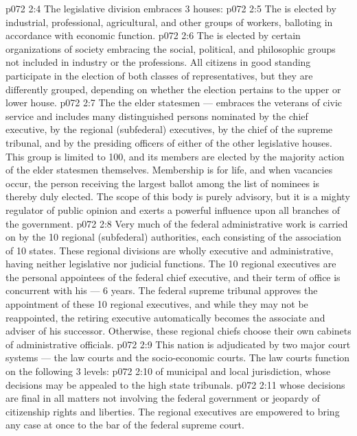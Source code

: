 \vs p072 2:4 \pc The legislative division embraces 3 houses:
\vs p072 2:5 \bibnobreakspace The  is elected by industrial, professional, agricultural, and other groups of workers, balloting in accordance with economic function.
\vs p072 2:6 \bibnobreakspace The  is elected by certain organizations of society embracing the social, political, and philosophic groups not included in industry or the professions. All citizens in good standing participate in the election of both classes of representatives, but they are differently grouped, depending on whether the election pertains to the upper or lower house.
\vs p072 2:7 \bibnobreakspace The  the elder statesmen --- embraces the veterans of civic service and includes many distinguished persons nominated by the chief executive, by the regional (subfederal) executives, by the chief of the supreme tribunal, and by the presiding officers of either of the other legislative houses. This group is limited to 100, and its members are elected by the majority action of the elder statesmen themselves. Membership is for life, and when vacancies occur, the person receiving the largest ballot among the list of nominees is thereby duly elected. The scope of this body is purely advisory, but it is a mighty regulator of public opinion and exerts a powerful influence upon all branches of the government.
\vs p072 2:8 \pc Very much of the federal administrative work is carried on by the 10 regional (subfederal) authorities, each consisting of the association of 10 states. These regional divisions are wholly executive and administrative, having neither legislative nor judicial functions. The 10 regional executives are the personal appointees of the federal chief executive, and their term of office is concurrent with his --- 6 years. The federal supreme tribunal approves the appointment of these 10 regional executives, and while they may not be reappointed, the retiring executive automatically becomes the associate and adviser of his successor. Otherwise, these regional chiefs choose their own cabinets of administrative officials.
\vs p072 2:9 \pc This nation is adjudicated by two major court systems --- the law courts and the socio\hyp{}economic courts. The law courts function on the following 3 levels:
\vs p072 2:10 \bibnobreakspace {} of municipal and local jurisdiction, whose decisions may be appealed to the high state tribunals.
\vs p072 2:11 \bibnobreakspace {} whose decisions are final in all matters not involving the federal government or jeopardy of citizenship rights and liberties. The regional executives are empowered to bring any case at once to the bar of the federal supreme court.

